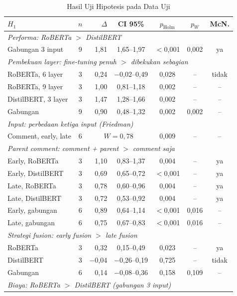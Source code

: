 \documentclass[conference]{IEEEtran}
\begin{document}
\begin{table}[t]
\caption{Hasil Uji Hipotesis pada Data Uji}
\label{tab:uji}
\centering
\footnotesize
\setlength{\tabcolsep}{2.2pt}
\begin{tabular}{lcrcccc}
\hline
$H_1$ & $n$ & $\Delta$ & CI 95\% & $p_{\mathrm{Holm}}$ & $p_W$ & McN. \\
\hline
\multicolumn{7}{l}{\textit{Performa: RoBERTa $>$ DistilBERT}} \\
Gabungan 3 input & 9 & 1,81 & 1,65--1,97 & $<$0,001 & 0,002 & ya \\
\hline
\multicolumn{7}{l}{\textit{Pembekuan layer: fine-tuning penuh $>$ dibekukan sebagian}} \\
RoBERTa, 6 layer & 3 & 0,24 & $-$0,02--0,49 & 0,028 & -- & tidak \\
RoBERTa, 9 layer & 3 & 1,00 & 0,81--1,18 & 0,002 & -- & -- \\
DistilBERT, 3 layer & 3 & 1,47 & 1,28--1,66 & 0,002 & -- & -- \\
Gabungan & 9 & 0,90 & 0,48--1,32 & 0,002 & 0,002 & -- \\
\hline
\multicolumn{7}{l}{\textit{Input: perbedaan ketiga input (Friedman)}} \\
Comment, early, late & 6 & \multicolumn{2}{c}{$W = 0{,}78$} & 0,009 & -- & -- \\
\hline
\multicolumn{7}{l}{\textit{Parent comment: comment + parent $>$ comment saja}} \\
Early, RoBERTa & 3 & 1,10 & 0,83--1,37 & 0,004 & -- & ya \\
Early, DistilBERT & 3 & 0,69 & 0,65--0,72 & $<$0,001 & -- & ya \\
Late, RoBERTa & 3 & 0,78 & 0,60--0,96 & 0,004 & -- & ya \\
Late, DistilBERT & 3 & 0,72 & 0,53--0,92 & 0,004 & -- & ya \\
Early, gabungan & 6 & 0,89 & 0,64--1,14 & $<$0,001 & 0,016 & -- \\
Late, gabungan & 6 & 0,75 & 0,67--0,83 & $<$0,001 & 0,016 & -- \\
\hline
\multicolumn{7}{l}{\textit{Strategi fusion: early fusion $>$ late fusion}} \\
RoBERTa & 3 & 0,32 & 0,15--0,49 & 0,023 & -- & ya \\
DistilBERT & 3 & $-$0,04 & $-$0,26--0,19 & 0,725 & -- & tidak \\
Gabungan & 6 & 0,14 & $-$0,08--0,36 & 0,158 & 0,109 & -- \\
\hline
\multicolumn{7}{l}{\textit{Biaya: RoBERTa $>$ DistilBERT (gabungan 3 input)}} \\

\end{tabular}
\end{table}
\end{document}
